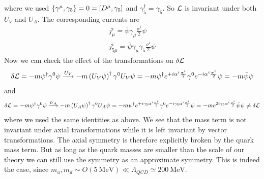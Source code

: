 where we used $\lbrace \gamma^{\mu},\gamma_5 \rbrace = 0 = \left[ D^{\mu},\gamma_5 \right]$ and $\gamma_5^{\dagger} = \gamma_5$.
So $\mathcal{L}$ is invariant under both $U_V$ and $U_A$.
The corresponding currents are
\begin{align}
& j_{\mu}^i = \bar{\psi} \gamma_{\mu} \frac{\sigma^i}{2} \psi & \label{eqn:jV} \\
& j_{5\mu}^i = \bar{\psi} \gamma_{\mu} \gamma_5 \frac{\sigma^i}{2} \label{eqn:jA} \psi & 
\end{align}
Now we can check the effect of the transformations on $\delta \mathcal{L}$
\begin{equation}
\delta \mathcal{L} = - m \psi^{\dagger}\gamma^0 \psi \overset{U_V}{\longrightarrow} - m \left( U_V \psi \right)^{\dagger}\gamma^0 U_V \psi = - m \psi^{\dagger} e^{+i\alpha^i \frac{\sigma^i}{2}} \gamma^0 e^{-i\alpha^i \frac{\sigma^i}{2}} \psi = - m \bar{\psi} \psi
\end{equation}
and 
\begin{equation}
\delta \mathcal{L} = - m \psi^{\dagger}\gamma^0 \psi \overset{U_A}{\longrightarrow} - m \left( U_A \psi \right)^{\dagger}\gamma^0 U_A \psi = - m \psi^{\dagger} e^{+i \gamma_5 \alpha^i  \frac{\sigma^i}{2}} \gamma^0 e^{-i \gamma_5 \alpha^i \frac{\sigma^i}{2}} \psi = - m e^{2i \gamma_5 \alpha^i \frac{\sigma^i}{2}} \bar{\psi} \psi \neq \delta \mathcal{L}
\end{equation}
where we used the same identities as above. We see that the mass term is not invariant under axial transformations while it is left invariant by vector transformations. The axial symmetry is therefore explicitly broken by the quark mass term. But as long as the quark masses are smaller than the scale of our theory we can still use the symmetry as an approximate symmetry. This is indeed the case, since $m_u,m_d \sim O(5 \ \mathrm{MeV}) \ll \Lambda_{QCD} \simeq 200 \ \mathrm{MeV}$.

